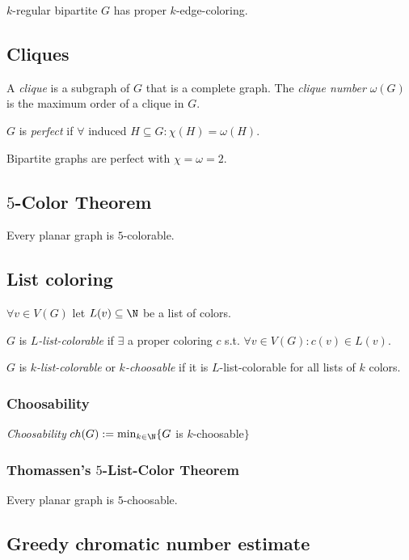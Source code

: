 $k$-regular bipartite $G$ has proper $k$-edge-coloring.

\subsection*{Cliques}

A \emph{clique} is a subgraph of $G$ that is a complete graph.
The \emph{clique number} $\omega(G)$ is the maximum order of a clique in $G$.

\spacing

$G$ is \emph{perfect} if $\forall$ induced $H \subseteq G : \chi(H) = \omega(H)$.

Bipartite graphs are perfect with $\chi = \omega = 2$.

\subsection*{$5$-Color Theorem}

Every planar graph is $5$-colorable.

\subsection*{List coloring}

$\forall v \in V(G)$ let $L(v) \subseteq \N$ be a list of colors.

$G$ is \emph{$L$-list-colorable} if $\exists$ a proper coloring $c$ s.t. $\forall v \in V(G) : c(v) \in L(v)$.

\spacing

$G$ is \emph{$k$-list-colorable} or \emph{$k$-choosable} if it is $L$-list-colorable for all lists of $k$ colors.

\subsubsection*{Choosability}

\emph{Choosability} $ch(G) := \min_{k\in\N}\{ G$ is $k$-choosable$\}$

\subsubsection*{Thomassen's $5$-List-Color Theorem}

Every planar graph is $5$-choosable.

\subsection*{Greedy chromatic number estimate}

